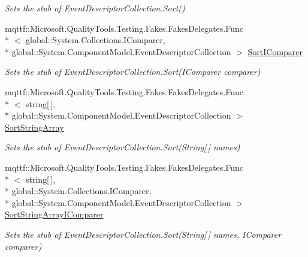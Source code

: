 \begin{DoxyCompactItemize}
\begin{DoxyCompactList}\small\item\em Sets the stub of Event\-Descriptor\-Collection.\-Sort()\end{DoxyCompactList}\item 
mqttf\-::\-Microsoft.\-Quality\-Tools.\-Testing.\-Fakes.\-Fakes\-Delegates.\-Func\\*
$<$ global\-::\-System.\-Collections.\-I\-Comparer, \\*
global\-::\-System.\-Component\-Model.\-Event\-Descriptor\-Collection $>$ \hyperlink{class_system_1_1_component_model_1_1_fakes_1_1_stub_event_descriptor_collection_ac594d2ba26e8c1d2a68cd9618a64beb7}{Sort\-I\-Comparer}
\begin{DoxyCompactList}\small\item\em Sets the stub of Event\-Descriptor\-Collection.\-Sort(\-I\-Comparer comparer)\end{DoxyCompactList}\item 
mqttf\-::\-Microsoft.\-Quality\-Tools.\-Testing.\-Fakes.\-Fakes\-Delegates.\-Func\\*
$<$ string\mbox{[}$\,$\mbox{]}, \\*
global\-::\-System.\-Component\-Model.\-Event\-Descriptor\-Collection $>$ \hyperlink{class_system_1_1_component_model_1_1_fakes_1_1_stub_event_descriptor_collection_a67e78fc45f37fb93aac7424dce34c37e}{Sort\-String\-Array}
\begin{DoxyCompactList}\small\item\em Sets the stub of Event\-Descriptor\-Collection.\-Sort(\-String\mbox{[}$\,$\mbox{]} names)\end{DoxyCompactList}\item 
mqttf\-::\-Microsoft.\-Quality\-Tools.\-Testing.\-Fakes.\-Fakes\-Delegates.\-Func\\*
$<$ string\mbox{[}$\,$\mbox{]}, \\*
global\-::\-System.\-Collections.\-I\-Comparer, \\*
global\-::\-System.\-Component\-Model.\-Event\-Descriptor\-Collection $>$ \hyperlink{class_system_1_1_component_model_1_1_fakes_1_1_stub_event_descriptor_collection_a93ef102aeec7f94e484e5fecff19bcea}{Sort\-String\-Array\-I\-Comparer}
\begin{DoxyCompactList}\small\item\em Sets the stub of Event\-Descriptor\-Collection.\-Sort(\-String\mbox{[}$\,$\mbox{]} names, I\-Comparer comparer)\end{DoxyCompactList}\end{DoxyCompactItemize}
